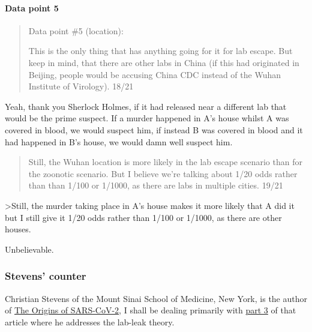 \documentclass[11pt]{article}
\begin{document}
\paragraph{Data point 5}
\label{sec:orgf60866f}
\begin{quote}
Data point \#5 (location):

This is the only thing that has anything going for it for lab escape. But keep in mind, that there are other labs in China (if this had originated in Beijing, people would be accusing China CDC instead of the Wuhan Institute of Virology). 18/21
\end{quote}
Yeah, thank you Sherlock Holmes, if it had released near a different lab that would be the prime suspect. If a murder happened in A's house whilst A was covered in blood, we would suspect him, if instead B was covered in blood and it had happened in B's house, we would damn well suspect him.

\begin{quote}
Still, the Wuhan location is more likely in the lab escape scenario than for the zoonotic scenario. But I believe we're talking about 1/20 odds rather than than 1/100 or 1/1000, as there are labs in multiple cities. 19/21
\end{quote}
>Still, the murder taking place in A's house makes it more likely that A did it but I still give it 1/20 odds rather than 1/100 or 1/1000, as there are other houses.

Unbelievable.
\subsubsection{Stevens' counter}
\label{sec:orge1eaec7}
Christian Stevens of the Mount Sinai School of Medicine, New York, is the author of \href{https://archive.is/WhXNj}{The Origins of SARS-CoV-2}, I shall be dealing primarily with \href{https://archive.is/ZOZGm}{part 3} of that article where he addresses the lab-leak theory.
\end{document}
